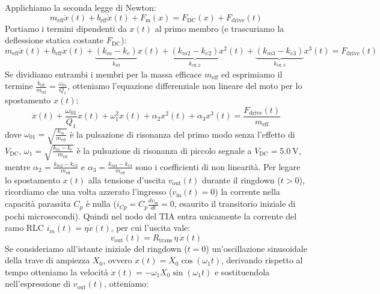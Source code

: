\documentclass[11pt,a4paper]{article}
\begin{document}
\vspace{0.3cm}
\noindent Applichiamo la seconda legge di Newton:
\begin{equation}
    m_{\text{eff}} \ddot{x}(t) + b_{\text{eff}} \dot{x}(t) + F_{\text{m}}(x) = F_{\text{DC}}(x) + F_{\text{drive}}(t)
\end{equation}
Portiamo i termini dipendenti da $x(t)$ al primo membro (e trascuriamo la deflessione statica costante $F_{\text{DC}}$):
\begin{equation}
    m_{\text{eff}} \ddot{x}(t) + b_{\text{eff}} \dot{x}(t) + \underbrace{(k_m - k_e)}_{k_{\text{eff}}} x(t) + \underbrace{(k_{m2} - k_{e2})}_{k_{\text{eff}, 2}} x^2(t) + \underbrace{(k_{m3} - k_{e3})}_{k_{\text{eff}, 3}} x^3(t) = F_{\text{drive}}(t)
\end{equation}
Se dividiamo entrambi i membri per la massa efficace $m_{\text{eff}}$ ed esprimiamo il termine $\frac{b_{\text{eff}}}{m_{\text{eff}}} = \frac{\omega_{01}}{Q_1}$, otteniamo l'equazione differenziale non lineare del moto per lo spostamento $x(t)$:
\begin{equation}
    \label{eq:oscillatore_non_lineare}
    \ddot{x}(t) + \frac{\omega_{01}}{Q_1}\dot{x}(t) + \omega_1^2 x(t) + \alpha_2 x^2(t) + \alpha_3 x^3(t) = \frac{F_{\text{drive}}(t)}{m_{\text{eff}}}
\end{equation}
dove $\omega_{01} = \sqrt{\frac{k_m}{m_{\text{eff}}}}$ è la pulsazione di risonanza del primo modo senza l'effetto di $V_{\text{DC}}$, $\omega_1 = \sqrt{\frac{k_m - k_e}{m_{\text{eff}}}}$ è la pulsazione di risonanza di piccolo segnale a $V_{\text{DC}} = \SI{5.0}{\volt}$, mentre $\alpha_2 = \frac{k_{m2} - k_{e2}}{m_{\text{eff}}}$ e $\alpha_3 = \frac{k_{m3} - k_{e3}}{m_{\text{eff}}}$ sono i coefficienti di non linearità.
\vspace{0.3cm}
\noindent Per legare lo spostamento $x(t)$ alla tensione d'uscita $v_{\text{out}}(t)$ durante il ringdown ($t > 0$), ricordiamo che una volta azzerato l'ingresso ($v_{\text{in}}(t) = 0$) la corrente nella capacità parassita $C_p$ è nulla ($i_{Cp} = C_p \frac{dv_{\text{in}}}{dt} = 0$, esaurito il transitorio iniziale di pochi microsecondi). Quindi nel nodo del TIA entra unicamente la corrente del ramo RLC $i_m(t) = \eta \dot{x}(t)$, per cui l'uscita vale:
\begin{equation}
    v_{\text{out}}(t) = R_{\text{trans}} \, \eta \, \dot{x}(t)
\end{equation}
Se consideriamo all'istante iniziale del ringdown ($t = 0$) un'oscillazione sinusoidale della trave di ampiezza $X_0$, ovvero $x(t) = X_0 \cos(\omega_1 t)$, derivando rispetto al tempo otteniamo la velocità $\dot{x}(t) = -\omega_1 X_0 \sin(\omega_1 t)$ e sostituendola nell'espressione di $v_{\text{out}}(t)$, otteniamo:
\end{document}
